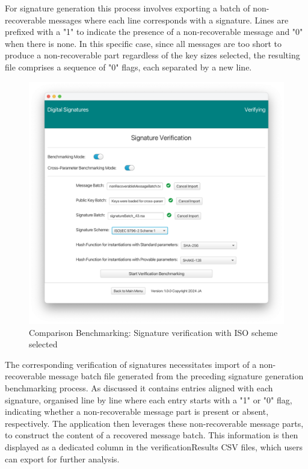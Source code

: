 \documentclass[]{final_report}
\theoremstyle{definition}
\begin{document}
For signature generation this process involves exporting a batch of non-recoverable messages where each line corresponds with a signature. Lines are prefixed with a "1" to indicate the presence of a non-recoverable message and "0" when there is none. In this specific case, since all messages are too short to produce a non-recoverable part regardless of the key sizes selected, the resulting file comprises a sequence of "0" flags, each separated by a new line.


\begin{figure}[H]
    \centering
    \includegraphics[width=\textwidth]{main_pictures/ui/verifying/verifying10.png}
    \caption{Comparison Benchmarking: Signature verification with ISO scheme selected}
\end{figure}

The corresponding verification of signatures necessitates import of a non-recoverable message batch file generated from the preceding signature generation benchmarking process. As discussed it contains entries aligned with each signature, organised line by line where each entry starts with a "1" or "0" flag, indicating whether a non-recoverable message part is present or absent, respectively. The application then leverages these non-recoverable message parts, to construct the content of a recovered message batch. This information is then displayed as a dedicated column in the verificationResults CSV files, which users can export for further analysis.
\end{document}
